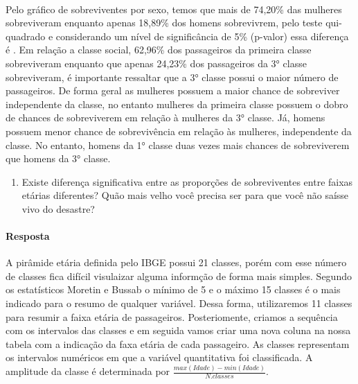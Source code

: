 \documentclass[11pt]{article}
\providecommand{\tightlist}{%
      \setlength{\itemsep}{0pt}\setlength{\parskip}{0pt}}
\begin{document}
    \begin{center}
    \end{center}
    { \hspace*{\fill} \\}
    
    Pelo gráfico de sobreviventes por sexo, temos que mais de 74,20\% das
mulheres sobreviveram enquanto apenas 18,89\% dos homens sobrevivrem,
pelo teste qui-quadrado e considerando um nível de significância de 5\%
(p-valor) essa diferença é . Em relação a classe social, 62,96\% dos
passageiros da primeira classe sobreviveram enquanto que apenas 24,23\%
dos passageiros da 3° classe sobreviveram, é importante ressaltar que a
3° classe possui o maior número de passageiros. De forma geral as
mulheres possuem a maior chance de sobreviver independente da classe, no
entanto mulheres da primeira classe possuem o dobro de chances de
sobreviverem em relação à mulheres da 3° classe. Já, homens possuem
menor chance de sobrevivência em relação às mulheres, independente da
classe. No entanto, homens da 1° classe duas vezes mais chances de
sobreviverem que homens da 3° classe.

    \begin{enumerate}
\def\labelenumi{\arabic{enumi})}
\setcounter{enumi}{2}
\tightlist
\item
  Existe diferença significativa entre as proporções de sobreviventes
  entre faixas etárias diferentes? Quão mais velho você precisa ser para
  que você não saísse vivo do desastre?
\end{enumerate}

\paragraph{Resposta}\label{resposta}

A pirâmide etária definida pelo IBGE possui 21 classes, porém com esse
número de classes fica difícil visulaizar alguma informção de forma mais
simples. Segundo os estatísticos Moretin e Bussab o mínimo de 5 e o
máximo 15 classes é o mais indicado para o resumo de qualquer variável.
Dessa forma, utilizaremos 11 classes para resumir a faixa etária de
passageiros. Posteriomente, criamos a sequência com os intervalos das
classes e em seguida vamos criar uma nova coluna na nossa tabela com a
indicação da faxa etária de cada passageiro. As classes representam os
intervalos numéricos em que a variável quantitativa foi classificada. A
amplitude da classe é determinada por
\(\frac{max(Idade) - min(Idade)}{N. classes}\).
\end{document}
